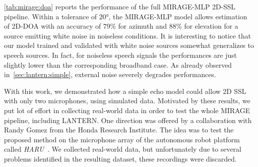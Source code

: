 \cref{tab:mirage:doa} reports the performance of the full MIRAGE-MLP 2D-SSL pipeline.
Within a tolerance of $\ang{20}$, the MIRAGE-MLP model allows estimation of 2D-\ac{DOA} with an accuracy of 79\% for azimuth and 88\% for elevation for a source emitting white noise in noiseless conditions.
It is interesting to notice that our model trained and validated with white noise sources somewhat generalizes to speech sources.
In fact, for noiseless speech signals the performances are just slightly lower than the corresponding broadband case.
As already observed in~\cref{sec:lantern:simple}, external noise severely degrades performances.

\mynewline
With this work, we demonstrated how a simple echo model could allow 2D SSL with only two microphones, using simulated data.
Motivated by these results, we put lot of effort in collecting real-world data in order to test the whole \ac{MIRAGE} pipeline, including \ac{LANTERN}.
One direction was offered by a collaboration with Randy Gomez from the Honda Research Institute.
The idea was to test the proposed method on the microphone array of the autonomous robot platform called \textit{HARU}~.
We collected real-world data, but unfortunately due to several problems identified in the resulting dataset, these recordings were discarded.




